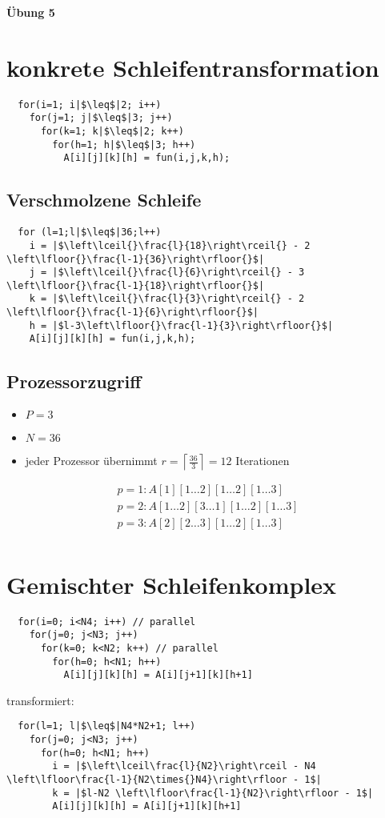 \documentclass{article}
\begin{document}
{\LARGE\textbf{Übung 5}}

\section{konkrete Schleifentransformation}
\begin{verbatim}
  for(i=1; i|$\leq$|2; i++)
    for(j=1; j|$\leq$|3; j++)
      for(k=1; k|$\leq$|2; k++)
        for(h=1; h|$\leq$|3; h++)
          A[i][j][k][h] = fun(i,j,k,h);
\end{verbatim}

\subsection{Verschmolzene Schleife}
\begin{verbatim}
  for (l=1;l|$\leq$|36;l++)
    i = |$\left\lceil{}\frac{l}{18}\right\rceil{} - 2 \left\lfloor{}\frac{l-1}{36}\right\rfloor{}$|
    j = |$\left\lceil{}\frac{l}{6}\right\rceil{} - 3 \left\lfloor{}\frac{l-1}{18}\right\rfloor{}$|
    k = |$\left\lceil{}\frac{l}{3}\right\rceil{} - 2 \left\lfloor{}\frac{l-1}{6}\right\rfloor{}$|
    h = |$l-3\left\lfloor{}\frac{l-1}{3}\right\rfloor{}$|
    A[i][j][k][h] = fun(i,j,k,h);
\end{verbatim}

\subsection{Prozessorzugriff}
\begin{itemize}
  \item $P=3$
  \item $N=36$
  \item jeder Prozessor übernimmt $r=\left\lceil{}\frac{36}{3}\right\rceil{} = 12$ Iterationen
\end{itemize}
\begin{align}
  p=1: A[1][1\dots2][1\dots2][1\dots3] \\
  p=2: A[1\dots2][3\dots1][1\dots2][1\dots3] \\
  p=3: A[2][2\dots3][1\dots2][1\dots3] \\
\end{align}

\newpage
\section{Gemischter Schleifenkomplex}
\begin{verbatim}
  for(i=0; i<N4; i++) // parallel
    for(j=0; j<N3; j++)
      for(k=0; k<N2; k++) // parallel
        for(h=0; h<N1; h++)
          A[i][j][k][h] = A[i][j+1][k][h+1]
\end{verbatim}
transformiert:
\begin{verbatim}
  for(l=1; l|$\leq$|N4*N2+1; l++)
    for(j=0; j<N3; j++)
      for(h=0; h<N1; h++)
        i = |$\left\lceil\frac{l}{N2}\right\rceil - N4 \left\lfloor\frac{l-1}{N2\times{}N4}\right\rfloor - 1$|
        k = |$l-N2 \left\lfloor\frac{l-1}{N2}\right\rfloor - 1$|
        A[i][j][k][h] = A[i][j+1][k][h+1]
\end{verbatim}
\end{document}
